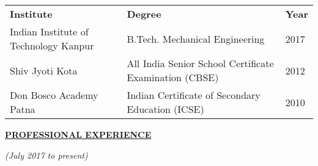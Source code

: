 \documentclass[a4paper]{deedy-resume} %
\begin{document}
\begin{tabular}{|l|l|l|}
\cline{1-3}
\rule{0pt}{2.2ex}
\textbf{\hspace{60pt}Institute\hspace{90pt}}&\textbf{\hspace{120pt}Degree\hspace{120pt} }&\textbf{\hspace{20pt}Year\hspace{20pt} }\\
\cline{1-3}
\rule{0pt}{2.2ex}
\hspace{6pt}Indian Institute of Technology Kanpur        \hspace{10pt}&\hspace{74pt}B.Tech. Mechanical Engineering&\hspace{20pt}2017 \\
\hspace{47pt}Shiv Jyoti Kota\hspace{45pt}&\hspace{20pt}All India Senior School Certificate Examination (CBSE)&\hspace{20pt}2012\\
\hspace{26pt}Don Bosco Academy Patna&\hspace{32pt}Indian Certificate of Secondary Education (ICSE)\hspace{17pt}&\hspace{20pt}2010\\
\cline{1-3}
\end{tabular}
\sectionspace

{\uppercase\uline{\textbf{\large{Professional Experience}}\hfill}}
\microspace


\hfill {\textit{\small(July 2017 to present)}}\\
\end{document}
